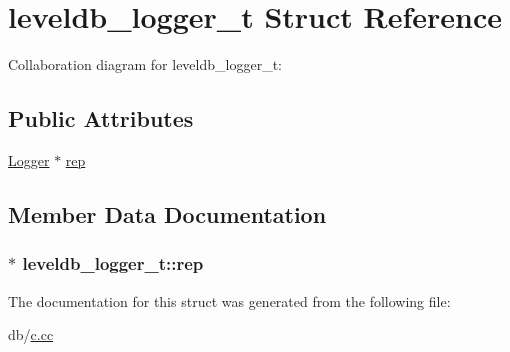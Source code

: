 \hypertarget{structleveldb__logger__t}{\section{leveldb\-\_\-logger\-\_\-t Struct Reference}
\label{structleveldb__logger__t}
}


Collaboration diagram for leveldb\-\_\-logger\-\_\-t\-:
\subsection*{Public Attributes}
\begin{DoxyCompactItemize}
\item 
\hyperlink{classleveldb_1_1_logger}{Logger} $\ast$ \hyperlink{structleveldb__logger__t_aa27dd9e07077dbde7b776c8f548c749b}{rep}
\end{DoxyCompactItemize}


\subsection{Member Data Documentation}
\hypertarget{structleveldb__logger__t_aa27dd9e07077dbde7b776c8f548c749b}{
\subsubsection[{rep}]{$\ast$ leveldb\-\_\-logger\-\_\-t\-::rep}}\label{structleveldb__logger__t_aa27dd9e07077dbde7b776c8f548c749b}


The documentation for this struct was generated from the following file\-:\begin{DoxyCompactItemize}
\item 
db/\hyperlink{c_8cc}{c.\-cc}\end{DoxyCompactItemize}

